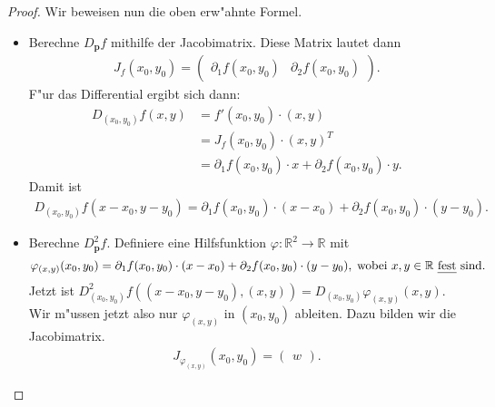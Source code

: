 \documentclass{article}
\newcommand{\R}{\mathbb{R}}
\begin{document}
\begin{proof}
	Wir beweisen nun die oben erw"ahnte Formel.
	\begin{itemize}
		\item Berechne $D_{\mathbf p}f$ mithilfe der Jacobimatrix. Diese Matrix lautet dann
		\begin{align*}
    			J_f(x_0,y_0) = 
			\begin{pmatrix}
				\partial_1 f(x_0,y_0) & \partial_2 f(x_0,y_0)                        
                       	\end{pmatrix}.                                
                       \end{align*}                          
                       F"ur das Differential ergibt sich dann:                   
                       \begin{align*}                                 
                       D_{(x_0,y_0)}f(x,y) &= f'(x_0,y_0)\cdot(x,y) \nonumber \\
                      &= J_f(x_0,y_0) \cdot (x,y)^T\nonumber \\
                      &=\partial_1 f(x_0,y_0) \cdot x + \partial_2 f(x_0,y_0) \cdot y. \label{hurensohn}
                       \end{align*}      
                       Damit ist 
                       \begin{align*}
                       	D_{(x_0,y_0)}f(x-x_0,y-y_0) = \partial_1 f(x_0,y_0) \cdot (x-x_0) + \partial_2 f(x_0,y_0) \cdot (y-y_0).
                       \end{align*}      
                       
                       
                       
                 \item Berechne $D^2_{\mathbf p}f$. Definiere eine Hilfsfunktion $\varphi: \R^2 \to \R$ mit 
                 \[
                 	\varphi_{(x,y)}(x_0,y_0) =  \partial_1 f(x_0,y_0) \cdot (x-x_0) + \partial_2 f(x_0,y_0) \cdot (y-y_0), \; \text{wobei $x,y \in \R$ \emph{fest} sind.}
		\]
		Jetzt ist $D^2_{(x_0,y_0)}f((x-x_0,y-y_0),(x,y)) = D_{(x_0,y_0)}\varphi_{(x,y)}(x,y)$. Wir m"ussen jetzt also nur $\varphi_{(x,y)}$ in $(x_0,y_0)$ ableiten. Dazu bilden wir die Jacobimatrix.
		\begin{align*}
			J_{\varphi_{(x,y)}}(x_0,y_0) =
			 \begin{pmatrix} 
				w
			\end{pmatrix}.
		\end{align*}
		                  
	\end{itemize}
\end{proof}
\end{document}
